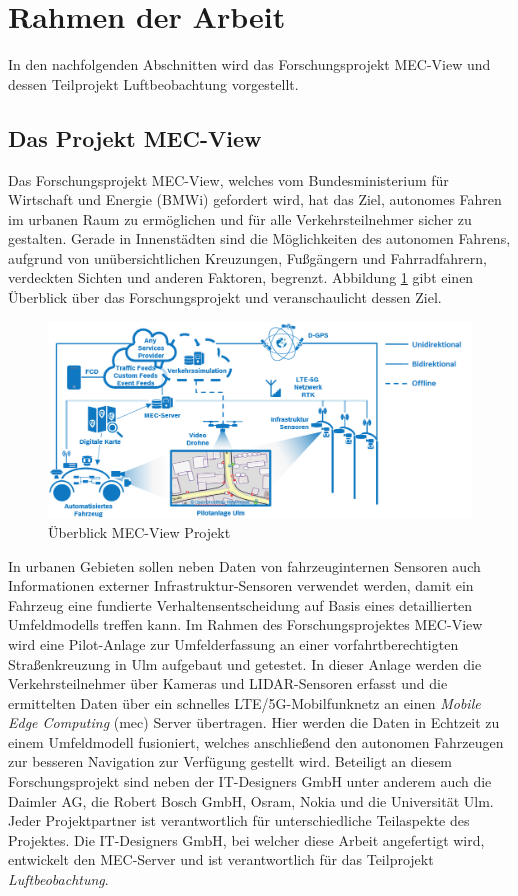 \section{Rahmen der Arbeit}
\label{sec:rahmen_arbeit}

In den nachfolgenden Abschnitten wird das Forschungsprojekt MEC-View und dessen Teilprojekt Luftbeobachtung
vorgestellt.

\subsection{Das Projekt MEC-View}
\label{sec:mec_view}

Das Forschungsprojekt MEC-View, welches vom Bundesministerium für Wirtschaft und Energie (BMWi) gefordert wird,
hat das Ziel, autonomes Fahren im urbanen Raum zu ermöglichen und für alle Verkehrsteilnehmer sicher zu gestalten.
Gerade in Innenstädten sind die Möglichkeiten des autonomen Fahrens, aufgrund von unübersichtlichen Kreuzungen,
Fußgängern und Fahrradfahrern, verdeckten Sichten und anderen Faktoren, begrenzt.
Abbildung \ref{fig:intro_mec_view_arch} gibt einen Überblick über das Forschungsprojekt und veranschaulicht dessen Ziel.

\begin{figure}[H]
\centering
    \includegraphics[width=0.7\linewidth]{resources/img/mec_view_arch}
\caption[Überblick MEC-View Projekt]{Überblick MEC-View Projekt \cite[]{mecViewWeb}}
\label{fig:intro_mec_view_arch}
\end{figure}

In urbanen Gebieten
sollen neben Daten von fahrzeuginternen Sensoren auch Informationen externer Infrastruktur-Sensoren verwendet werden,
damit ein Fahrzeug eine fundierte Verhaltensentscheidung auf Basis eines detaillierten Umfeldmodells treffen kann.
Im Rahmen des Forschungsprojektes MEC-View wird eine Pilot-Anlage zur Umfelderfassung an einer vorfahrtberechtigten Straßenkreuzung
in Ulm aufgebaut und getestet. In dieser Anlage werden die Verkehrsteilnehmer über Kameras und LIDAR-Sensoren erfasst
und die ermittelten Daten über ein schnelles LTE/5G-Mobilfunknetz an einen \textit{Mobile Edge Computing} (\acrshort*{mec}) Server übertragen.
Hier werden die Daten in Echtzeit zu einem Umfeldmodell fusioniert, welches anschließend den autonomen Fahrzeugen
zur besseren Navigation zur Verfügung gestellt wird. Beteiligt an diesem Forschungsprojekt sind neben
der IT-Designers GmbH unter anderem auch die Daimler AG, die Robert Bosch GmbH, Osram, Nokia und die Universität Ulm.
Jeder Projektpartner ist verantwortlich für unterschiedliche Teilaspekte des Projektes. Die IT-Designers GmbH,
bei welcher diese Arbeit angefertigt wird, entwickelt den MEC-Server und ist verantwortlich für das
Teilprojekt \textit{Luftbeobachtung}. \cite[]{mecViewWeb}


